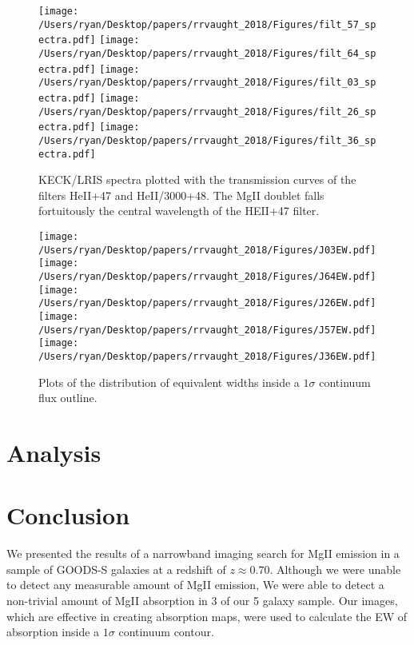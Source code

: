 \documentclass[twocolumn]{aastex6}
\begin{document}
\begin{figure*}[!htb]
\centering
\texttt{[image: /Users/ryan/Desktop/papers/rrvaught\_2018/Figures/filt\_57\_spectra.pdf]}
\texttt{[image: /Users/ryan/Desktop/papers/rrvaught\_2018/Figures/filt\_64\_spectra.pdf]}
\texttt{[image: /Users/ryan/Desktop/papers/rrvaught\_2018/Figures/filt\_03\_spectra.pdf]}
\texttt{[image: /Users/ryan/Desktop/papers/rrvaught\_2018/Figures/filt\_26\_spectra.pdf]}
\texttt{[image: /Users/ryan/Desktop/papers/rrvaught\_2018/Figures/filt\_36\_spectra.pdf]}
\caption{KECK/LRIS spectra plotted with the transmission curves of the filters HeII+47 and HeII/3000+48. The MgII doublet falls fortuitously the central wavelength of the HEII+47 filter. }
\label{fig:spec_images}
\end{figure*}

\begin{figure*}[ht!]
\centering
\texttt{[image: /Users/ryan/Desktop/papers/rrvaught\_2018/Figures/J03EW.pdf]}
\texttt{[image: /Users/ryan/Desktop/papers/rrvaught\_2018/Figures/J64EW.pdf]}
\texttt{[image: /Users/ryan/Desktop/papers/rrvaught\_2018/Figures/J26EW.pdf]}
\texttt{[image: /Users/ryan/Desktop/papers/rrvaught\_2018/Figures/J57EW.pdf]}
\texttt{[image: /Users/ryan/Desktop/papers/rrvaught\_2018/Figures/J36EW.pdf]}
\caption{ Plots of the distribution of equivalent widths inside a $1\sigma$ continuum flux outline. }
\label{fig:ew_images}
\end{figure*}

\section{Analysis}
\section{Conclusion}
We presented the results of a narrowband imaging search for MgII emission in a sample of GOODS-S galaxies at a redshift of $z \approx 0.70$. Although we were unable to detect any measurable amount of MgII emission, We were able to detect a non-trivial amount of MgII absorption in 3 of our 5 galaxy sample. Our images, which are effective in creating absorption maps, were used to calculate the EW of absorption inside a $1\sigma$ continuum contour. 

\end{document}
